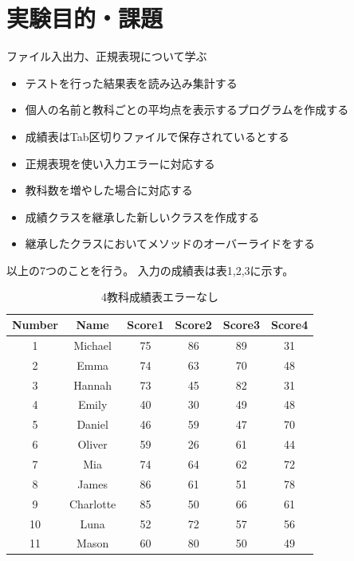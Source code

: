 \documentclass[dvipdfmx]{jsarticle}
\begin{document}
\section{実験目的・課題}

ファイル入出力、正規表現について学ぶ

\begin{itemize}
  \item テストを行った結果表を読み込み集計する
  \item 個人の名前と教科ごとの平均点を表示するプログラムを作成する
  \item 成績表はTab区切りファイルで保存されているとする
  \item 正規表現を使い入力エラーに対応する
  \item 教科数を増やした場合に対応する
  \item 成績クラスを継承した新しいクラスを作成する
  \item 継承したクラスにおいてメソッドのオーバーライドをする
\end{itemize}

以上の7つのことを行う。
入力の成績表は表1,2,3に示す。

\begin{table}[H]
  \begin{tabular}{cccccc}
    Number & Name & Score1 & Score2 & Score3 & Score4 \\ \hline
    1 & Michael & 75 & 86 & 89 & 31 \\
    2 & Emma & 74 & 63 & 70 & 48 \\
    3 & Hannah & 73 & 45 & 82 & 31 \\
    4 & Emily & 40 & 30 & 49 & 48 \\
    5 & Daniel & 46 & 59 & 47 & 70 \\
    6 & Oliver & 59 & 26 & 61 & 44 \\
    7 & Mia & 74 & 64 & 62 & 72 \\
    8 & James & 86 & 61 & 51 & 78 \\
    9 & Charlotte & 85 & 50 & 66 & 61 \\
    10 & Luna & 52 & 72 & 57 & 56 \\
    11 & Mason & 60 & 80 & 50 & 49 \\
  \end{tabular}
  \centering
  \caption{4教科成績表エラーなし}
  \label{in1}
\end{table}
\end{document}
